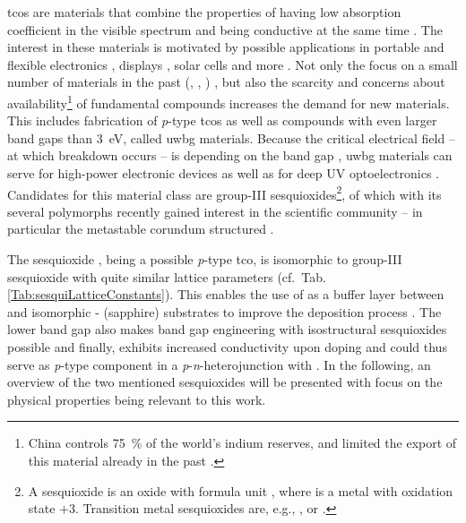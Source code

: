 \glspl{tco} are materials that combine the properties of having low absorption coefficient in the visible spectrum and being conductive at the same time
    \cite{ginley2011}.
The interest in these materials is motivated by possible applications in portable and flexible electronics
    \cite{guillen2011},
displays
    \cite{singh2024},
solar cells
    \cite{chavan2023}
and more
    \cite{ginley2011}.
Not only the focus on a small number of materials in the past (, , )
    \cite{ginley2011},
but also the scarcity and concerns about availability\footnote{
    China controls \qty{75}{\percent} of the world's indium reserves, and limited the export of this material already in the past \cite{candelise2011}.
} of fundamental compounds
    \cite{candelise2011}
increases the demand for new materials.
This includes fabrication of \textit{p}-type \glspl{tco} as well as compounds with even larger band gaps than \qty{3}{eV}, called \gls{uwbg} materials.
Because the critical electrical field -- at which breakdown occurs -- is depending on the band gap
    \cite{slobodyan2022},
\gls{uwbg} materials can serve for high-power electronic devices as well as for deep \gls{UV} optoelectronics
    \cite{wong2021}.
Candidates for this material class are group-III sesquioxides\footnote{
    A sesquioxide is an oxide with formula unit , where  is a metal with oxidation state $+3$.
    Transition metal sesquioxides are, e.g., ,  or .
},
of which  with its several polymorphs
    \cite{hassa2021a}
recently gained interest in the scientific community -- in particular the metastable corundum structured \agao.

The sesquioxide \cro, being a possible \textit{p}-type \gls{tco}, is isomorphic to group-III sesquioxide \agao{} with quite similar lattice parameters (cf.\ Tab.\,\ref{Tab:sesquiLatticeConstants}).
This enables the use of  as a buffer layer between \agao{} and isomorphic \textalpha- (sapphire) substrates to improve the deposition process
    \cite{stepanov2021}.
The lower band gap also makes band gap engineering with isostructural sesquioxides possible
    \cite{kaneko2010}
and finally,  exhibits increased conductivity upon doping
    \cite{uekawa1996}
and could thus serve as \textit{p}-type component in a \textit{p}-\textit{n}-heterojunction with \agao{}.
In the following, an overview of the two mentioned sesquioxides will be presented with focus on the physical properties being relevant to this work.